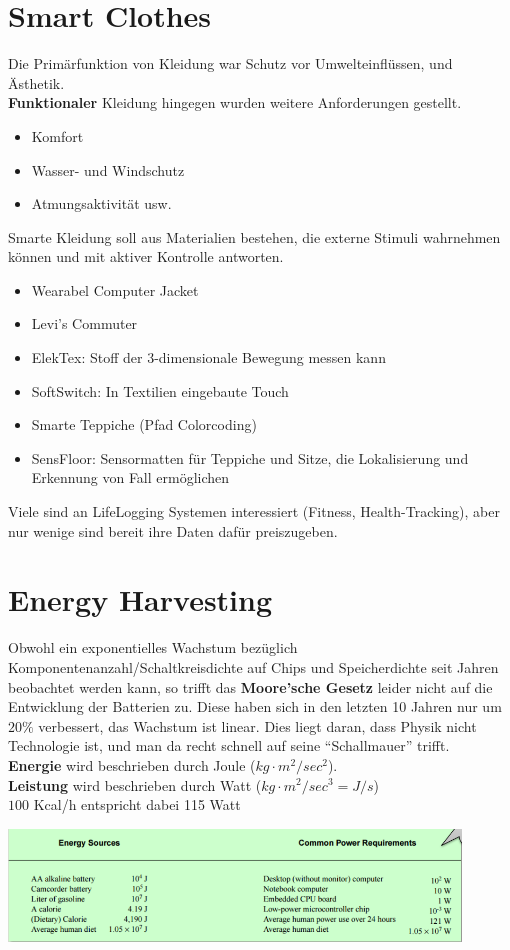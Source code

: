 \documentclass[a4paper]{article}
\begin{document}
\newpage
\section{Smart Clothes}
Die Primärfunktion von Kleidung war Schutz vor Umwelteinflüssen, und Ästhetik.\\
\textbf{Funktionaler} Kleidung hingegen wurden weitere Anforderungen gestellt. 
\begin{itemize}
	\item Komfort
	\item Wasser- und Windschutz
	\item Atmungsaktivität usw.
\end{itemize}
Smarte Kleidung soll aus Materialien bestehen, die externe Stimuli wahrnehmen können und mit aktiver Kontrolle antworten.
\begin{itemize}
	\item Wearabel Computer Jacket
	\item Levi's Commuter
	\item ElekTex: Stoff der 3-dimensionale Bewegung messen kann
	\item SoftSwitch: In Textilien eingebaute Touch
	\item Smarte Teppiche (Pfad Colorcoding)
	\item SensFloor: Sensormatten für Teppiche und Sitze, die Lokalisierung und Erkennung von Fall ermöglichen
\end{itemize}
Viele sind an LifeLogging Systemen interessiert (Fitness, Health-Tracking), aber nur wenige sind bereit ihre Daten dafür preiszugeben.

\newpage
\section{Energy Harvesting}
Obwohl ein exponentielles Wachstum bezüglich Komponentenanzahl/Schaltkreisdichte auf Chips und Speicherdichte seit Jahren beobachtet werden kann, so trifft das\textbf{ Moore'sche Gesetz} leider nicht auf die Entwicklung der Batterien zu. Diese haben sich in den letzten 10 Jahren nur um $20\%$ verbessert, das Wachstum ist linear. Dies liegt daran, dass Physik nicht Technologie ist, und man da recht schnell auf seine ``Schallmauer'' trifft.\\

\textbf{Energie} wird beschrieben durch Joule ($kg\cdot m^2 / sec^2$).\\
\textbf{Leistung} wird beschrieben durch Watt ($kg\cdot m^2 / sec^3 = J / s$) \\
$100$ Kcal/h entspricht dabei 115 Watt
\begin{center}
	\includegraphics[height = 3cm]{Energy.png}
\end{center}
\end{document}
